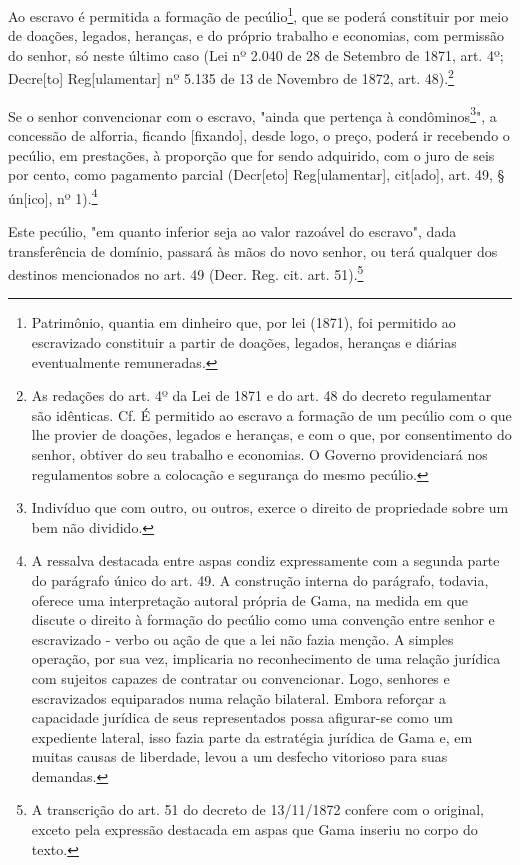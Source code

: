 Ao escravo é permitida a formação de pecúlio\footnote{Patrimônio,
  quantia em dinheiro que, por lei (1871), foi permitido ao escravizado
  constituir a partir de doações, legados, heranças e diárias
  eventualmente remuneradas.}, que se poderá constituir por meio de
doações, legados, heranças, e do próprio trabalho e economias, com
permissão do senhor, só neste último caso (Lei nº 2.040 de 28 de
Setembro de 1871, art. 4º; Decre{[}to{]} Reg{[}ulamentar{]} nº 5.135 de
13 de Novembro de 1872, art. 48).\footnote{As redações do art. 4º da
  Lei de 1871 e do art. 48 do decreto regulamentar são idênticas. Cf. É
  permitido ao escravo a formação de um pecúlio com o que lhe provier de
  doações, legados e heranças, e com o que, por consentimento do senhor,
  obtiver do seu trabalho e economias. O Governo providenciará nos
  regulamentos sobre a colocação e segurança do mesmo pecúlio.}

Se o senhor convencionar com o escravo, "ainda que pertença à
condôminos\footnote{Indivíduo que com outro, ou outros, exerce o
  direito de propriedade sobre um bem não dividido.}", a concessão de
alforria, ficando {[}fixando{]}, desde logo, o preço, poderá ir
recebendo o pecúlio, em prestações, à proporção que for sendo adquirido,
com o juro de seis por cento, como pagamento parcial (Decr{[}eto{]}
Reg{[}ulamentar{]}, cit{[}ado{]}, art. 49, § ún{[}ico{]}, nº
1).\footnote{A ressalva destacada entre aspas condiz expressamente com
  a segunda parte do parágrafo único do art. 49. A construção interna do
  parágrafo, todavia, oferece uma interpretação autoral própria de Gama,
  na medida em que discute o direito à formação do pecúlio como uma
  convenção entre senhor e escravizado - verbo ou ação de que a lei não
  fazia menção. A simples operação, por sua vez, implicaria no
  reconhecimento de uma relação jurídica com sujeitos capazes de
  contratar ou convencionar. Logo, senhores e escravizados equiparados
  numa relação bilateral. Embora reforçar a capacidade jurídica de seus
  representados possa afigurar-se como um expediente lateral, isso fazia
  parte da estratégia jurídica de Gama e, em muitas causas de liberdade,
  levou a um desfecho vitorioso para suas demandas.}

Este pecúlio, "em quanto inferior seja ao valor razoável do escravo",
dada transferência de domínio, passará às mãos do novo senhor, ou terá
qualquer dos destinos mencionados no art. 49 (Decr. Reg. cit. art.
51).\footnote{A transcrição do art. 51 do decreto de 13/11/1872
  confere com o original, exceto pela expressão destacada em aspas que
  Gama inseriu no corpo do texto.}

